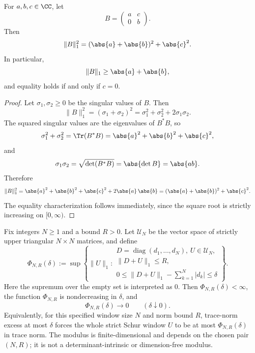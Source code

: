 \begin{lemma}
  \label{lem:two-by-two-trace-norm-pinching}
  For \(a,b,c\in\CC\), let
  \[
    B=\begin{pmatrix}a&c\\0&b\end{pmatrix}.
  \]
  Then
  \[
    \|B\|_1^2=(\abs{a}+\abs{b})^2+\abs{c}^2.
  \]
  In particular,
  \[
    \|B\|_1\ge \abs{a}+\abs{b},
  \]
  and equality holds if and only if \(c=0\).
\end{lemma}

\begin{proof}
  Let \(\sigma_1,\sigma_2\ge0\) be the singular values of \(B\). Then
  \[
    \|B\|_1^2=(\sigma_1+\sigma_2)^2
    =\sigma_1^2+\sigma_2^2+2\sigma_1\sigma_2.
  \]
  The squared singular values are the eigenvalues of \(B^*B\), so
  \[
    \sigma_1^2+\sigma_2^2=\Tr(B^*B)
    =\abs{a}^2+\abs{b}^2+\abs{c}^2,
  \]
  and
  \[
    \sigma_1\sigma_2=\sqrt{\det(B^*B)}
    =\abs{\det B}
    =\abs{ab}.
  \]
  Therefore
  \[
    \|B\|_1^2
    =\abs{a}^2+\abs{b}^2+\abs{c}^2+2\abs{a}\,\abs{b}
    =(\abs{a}+\abs{b})^2+\abs{c}^2.
  \]
  The equality characterization follows immediately, since the square
  root is strictly increasing on \([0,\infty)\).
\end{proof}

\begin{lemma}
  \label{lem:finite-schur-window-compactness-modulus}
  Fix integers \(N\ge1\) and a bound \(R>0\).  Let
  \(\mathcal U_N\) be the vector space of strictly upper triangular
  \(N\times N\) matrices, and define
  \[
    \Phi_{N,R}(\delta)
    :=
    \sup\left\{
      \|U\|_1:
      \begin{array}{l}
        D=\operatorname{diag}(d_1,\ldots,d_N),\ U\in\mathcal U_N,\\[2pt]
        \|D+U\|_1\le R,\\[2pt]
        0\le \|D+U\|_1-\sum_{k=1}^N |d_k|\le\delta
      \end{array}
    \right\}.
  \]
  Here the supremum over the empty set is interpreted as \(0\).  Then
  \(\Phi_{N,R}(\delta)<\infty\), the function \(\Phi_{N,R}\) is
  nondecreasing in \(\delta\), and
  \[
    \Phi_{N,R}(\delta)\longrightarrow0
    \qquad(\delta\downarrow0).
  \]
  Equivalently, for this specified window size \(N\) and norm bound \(R\),
  trace-norm excess at most \(\delta\) forces the whole strict Schur window
  \(U\) to be at most \(\Phi_{N,R}(\delta)\) in trace norm.  The modulus is
  finite-dimensional and depends on the chosen pair \((N,R)\); it is not a
  determinant-intrinsic or dimension-free modulus.
\end{lemma}

